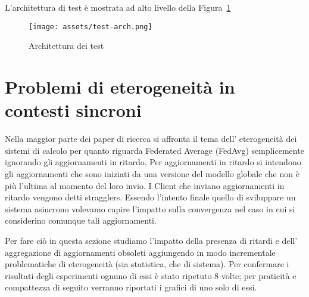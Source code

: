 \documentclass[a4paper, oneside, openright]{report}
\let\oldsection\section
\renewcommand{\section}{\newpage\oldsection}
\begin{document}
L'architettura di test è mostrata ad alto livello della Figura~\ref{fig:test-arch}

\begin{figure}[h]
\centering
\texttt{[image: assets/test-arch.png]}
\caption{Architettura dei test}\label{fig:test-arch}
\end{figure} \section{Problemi di eterogeneità in contesti sincroni}
Nella maggior parte dei paper di ricerca si affronta il tema dell' eterogeneità dei sistemi di calcolo per quanto riguarda Federated Average (FedAvg) semplicemente ignorando gli aggiornamenti in ritardo. Per aggiornamenti in ritardo si intendono gli aggiornamenti che sono iniziati da una versione del modello globale che non è più l'ultima al momento del loro invio. I Client che inviano aggiornamenti in ritardo vengono detti stragglers. Essendo l'intento finale quello di sviluppare un sistema asincrono volevamo capire l'impatto sulla convergenza nel caso in cui si considerino comunque tali aggiornamenti.

Per fare ciò in questa sezione studiamo l'impatto della presenza di ritardi e dell' aggregazione di aggiornamenti obsoleti aggiungendo in modo incrementale problematiche di eterogeneità (sia statistica, che di sistema). Per confermare i risultati degli esperimenti ognuno di essi è stato ripetuto 8 volte; per praticità e compattezza di seguito verranno riportati i grafici di uno solo di essi.
\end{document}

